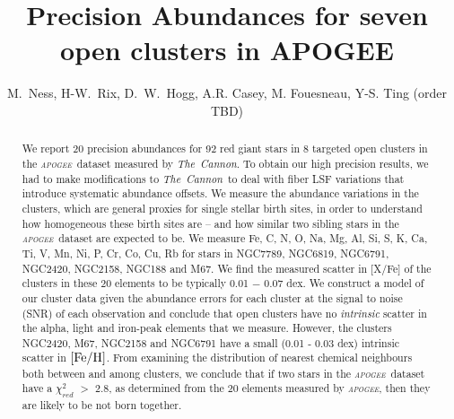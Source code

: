 \documentclass[14pt, preprint2]{aastex6}
\newcommand{\project}[1]{\textsl{#1}}
\newcommand{\tc}{\project{The~Cannon}}
\newcommand{\apogee}{\project{\textsc{apogee}}}
\newcommand{\feh}{\mbox{$\rm [Fe/H]$}}
\begin{document}


\title{Precision Abundances for seven open clusters in APOGEE  }
\author{M.~Ness,
        H-W.~Rix, 
        D.~W.~Hogg,
         A.R. Casey, M. Fouesneau, Y-S. Ting (order TBD)}



\begin{abstract} 

We report 20 precision abundances for 92 red giant stars in 8 targeted open clusters in the \apogee\ dataset measured by \tc. To obtain our high precision results, we had to make modifications to \tc\ to deal with fiber LSF variations that introduce systematic abundance offsets. We measure the abundance variations in the clusters, which are general proxies for single stellar birth sites, in order to understand how homogeneous these birth sites are -- and how similar two sibling stars in the \apogee\ dataset are expected to be. We measure Fe, C, N, O, Na, Mg, Al, Si, S, K, Ca, Ti, V, Mn, Ni, P, Cr, Co, Cu, Rb for stars in NGC7789, NGC6819, NGC6791, NGC2420, NGC2158, NGC188 and M67. We find the measured scatter in [X/Fe] of the clusters in these 20 elements to be typically 0.01 $-$ 0.07 dex. We construct a model of our cluster data given the abundance errors for each cluster at the signal to noise (SNR) of each observation and conclude that open clusters have no \textit{intrinsic} scatter in the alpha, light and iron-peak elements that we measure. However, the clusters NGC2420, M67, NGC2158 and NGC6791 have a small (0.01 - 0.03 dex) intrinsic scatter in \feh. From examining the distribution of nearest chemical neighbours both between and among clusters, we conclude that if two stars in the \apogee\ dataset have a $\chi^2_{red}$ $>$ 2.8,  as determined from the 20 elements measured by \apogee, then they are likely to be not born together.  
\end{abstract}
\end{document}
